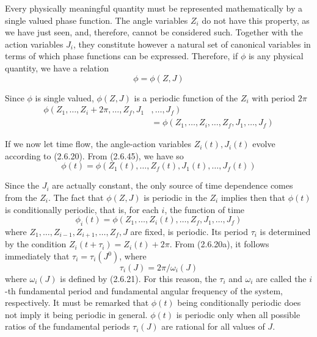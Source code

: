\documentclass{article}
\begin{document}
Every physically meaningful quantity must be represented mathematically by a single valued phase function. The angle variables $Z_{i}$ do not have this property, as we have just seen, and, therefore, cannot be considered such. Together with the action variables $J_{i}$, they constitute however a natural set of canonical variables in terms of which phase functions can be expressed. Therefore, if $\phi$ is any physical quantity, we have a relation
$$
\begin{equation*}
\phi=\phi(Z, J) \tag{2.6.45}
\end{equation*}
$$

Since $\phi$ is single valued, $\phi(Z, J)$ is a periodic function of the $Z_{i}$ with period $2 \pi$
$$
\begin{align*}
\phi\left(Z_{1}, \ldots, Z_{i}+2 \pi, \ldots, Z_{f}, J_{1}\right. & \left., \ldots, J_{f}\right)  \tag{2.6.46}\\
& =\phi\left(Z_{1}, \ldots, Z_{i}, \ldots, Z_{f}, J_{1}, \ldots, J_{f}\right)
\end{align*}
$$

If we now let time flow, the angle-action variables $Z_{i}(t), J_{i}(t)$ evolve according to (2.6.20). From (2.6.45), we have so
$$
\begin{equation*}
\phi(t)=\phi\left(Z_{1}(t), \ldots, Z_{f}(t), J_{1}(t), \ldots, J_{f}(t)\right) \tag{2.6.47}
\end{equation*}
$$

Since the $J_{i}$ are actually constant, the only source of time dependence comes from the $Z_{i}$. The fact that $\phi(Z, J)$ is periodic in the $Z_{i}$ implies then that $\phi(t)$ is conditionally periodic, that is, for each $i$, the function of time
$$
\begin{equation*}
\phi_{i}(t)=\phi\left(Z_{1}, \ldots, Z_{i}(t), \ldots, Z_{f}, J_{1}, \ldots, J_{f}\right) \tag{2.6.48}
\end{equation*}
$$
where $Z_{1}, \ldots, Z_{i-1}, Z_{i+1}, \ldots, Z_{f}, J$ are fixed, is periodic. Its period $\tau_{i}$ is determined by the condition $Z_{i}\left(t+\tau_{i}\right)=Z_{i}(t)+2 \pi$. From (2.6.20a), it follows immediately that $\tau_{i}=\tau_{i}\left(J^{0}\right)$, where
$$
\begin{equation*}
\tau_{i}(J)=2 \pi / \omega_{i}(J) \tag{2.6.49}
\end{equation*}
$$
where $\omega_{i}(J)$ is defined by (2.6.21). For this reason, the $\tau_{i}$ and $\omega_{i}$ are called the $i$-th fundamental period and fundamental angular frequency of the system, respectively. It must be remarked that $\phi(t)$ being conditionally periodic does not imply it being periodic in general. $\phi(t)$ is periodic only when all possible ratios of the fundamental periods $\tau_{i}(J)$ are rational for all values of $J$.
\end{document}
